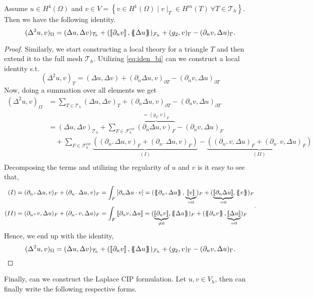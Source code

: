 \begin{lemma}
 Assume $u \in H^{4}( \Omega ) $ and $v \in  V = \left\{ v \in H^{1}( \Omega )  \mid  v \mid _{T} \in H^{m}( T) \ \forall T \in \mathcal{T} _{h}   \right\} $. Then we have the following identity.
\[
( \Delta ^2 u, v ) _{\Omega } = ( \Delta u, \Delta v)_{\mathcal{T} _{h} }  +  ( \left[\!\left[  \partial _{n} v \right]\!\right] , \left\{\!\!\left\{ \Delta u \right\}\!\!\right\})_{\mathcal{F}_{h} }  + ( g_{2} , v )_{\Gamma } - ( \partial _{n} v, \Delta u)_{\Gamma }.
\]

\end{lemma}
\begin{proof}
  Similarly, we start constructing a local theory for a triangle $T$ and then extend it to the full mesh $\mathcal{T}_{h} $.
Utilizing \eqref{eq:iden_bi} can we construct a local identity s.t. \[
( \Delta ^2 u, v ) _{T} = ( \Delta u, \Delta v) +  ( \partial _{n} \Delta u, v)_{\partial T} - ( \partial _{n} v, \Delta u) _{\partial T}
\]
Now, doing a summation over all elements we get \[
    \begin{split}
( \Delta ^2 u, v ) _{\Omega } & = \sum_{T \in \mathcal{T}_{h} }^{}  ( \Delta u, \Delta v)_{T}
+  ( \partial _{n} \Delta u, v)_{\partial T} - ( \partial _{n} v, \Delta u) _{\partial T} \\
 & =   ( \Delta u, \Delta v)_{\mathcal{T} _{h}} +  \sum_{F \in \mathcal{F}_{h}^{ext} }^{}
  \overbrace{( \partial _{n} \Delta u, v)_{ F}}^{=( g_{2},v)_{F} }  - ( \partial _{n} v, \Delta u) _{F} \\
  &   \quad + \sum_{F \in \mathcal{F}_{h}^{int} }^{} \underbrace{( ( \partial _{n^{+}} \Delta u, v)_{ F} + ( \partial _{n^{-}} \Delta u, v)_{ F} )}_{(I)}  - \underbrace{( ( \partial _{n^{+}} v, \Delta u) _{F} + ( \partial _{n^{-}} v, \Delta u) _{F}
  )}_{(II)}   \\
    \end{split}
\]
Decomposing the terms and utilizing the regularity of $u$ and $v$ is it easy to see that,    \[
\begin{split}
    (I) & = ( \partial _{n^{+}} \Delta u, v)_{ F} + ( \partial _{n^{-}} \Delta u, v)_{ F}  = \int_{F}^{} \left[ \partial _{n} \Delta u \cdot  v \right] =  (  \mean{ \partial _{n^{+}} \Delta u } , \underbrace{\jump{v  }}_{ = 0}      )_{ F} + (  \underbrace{\jump{ \partial _{n}
    \Delta u }}_{=0}  , \mean{v  }     )_{ F} \\
    (II) &=  ( \partial _{n^{+}} v, \Delta u) _{F} + ( \partial _{n^{-}} v, \Delta u) _{F} = \int_{F}^{} \jump{ \partial _{n} v, \Delta u } =  ( \underbrace{\jump{ \partial _{n} v}}_{ \neq 0 } , \mean{ \Delta u })_{F}  + ( \mean{ \partial _{n} v}, \underbrace{\jump{ \Delta u
    }}_{=0} )_{F}
\end{split} .
\]
Hence, we end up with the identity,
\[
( \Delta ^2 u, v ) _{\Omega } = ( \Delta u, \Delta v)_{\mathcal{T} _{h} }  +  ( \left[\!\left[  \partial _{n} v \right]\!\right] , \left\{\!\!\left\{ \Delta u \right\}\!\!\right\})_{\mathcal{F}_{h} }  + ( g_{2} , v )_{\Gamma } - ( \partial _{n} v, \Delta u)_{\Gamma }.
\]


\end{proof}
Finally, can we construct the Laplace CIP formulation. Let $u,v \in V_{h}$, then can finally write the following respective forms.

